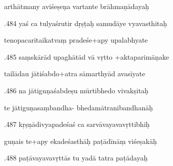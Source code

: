 \documentclass[article,12pt,a4paper]{memoir}%
\newcounter{parCount}
\begin{document}
	  
	  \pstart \leavevmode%
	arthātmany aviśeṣeṇa vartante brāhmaṇādayaḥ 
	{}
	\pend%
      

	  
	  \pstart {}.484 yaś ca tulyaśrutir dṛṣṭaḥ samudāye vyavasthitaḥ 
	{}
	\pend%
      

	  
	  \pstart \leavevmode%
	tenopacaritaikatvaṃ pradeśe+apy upalabhyate 
	{}
	\pend%
      

	  
	  \pstart {}.485 saṃskārād upaghātād vā vṛtto +aktaparimāṇake 
	{}
	\pend%
      

	  
	  \pstart \leavevmode%
	tailādau jātiśabdo+atra sāmarthyād avasīyate 
	{}
	\pend%
      

	  
	  \pstart {}.486 na jātiguṇaśabdeṣu mūrtibhedo vivakṣitaḥ 
	{}
	\pend%
      

	  
	  \pstart \leavevmode%
	te jātiguṇasaṃbandha- bhedamātranibandhanāḥ 
	{}
	\pend%
      

	  
	  \pstart {}.487 kṛṣṇādivyapadeśaś ca sarvāvayavavṛttibhiḥ 
	{}
	\pend%
      

	  
	  \pstart \leavevmode%
	guṇais te+apy ekadeśasthāḥ paṭādīnāṃ viśeṣakāḥ 
	{}
	\pend%
      

	  
	  \pstart {}.488 paṭāvayavavṛttās tu yadā tatra paṭādayaḥ 
	{}
	\pend%
      
\end{document}
